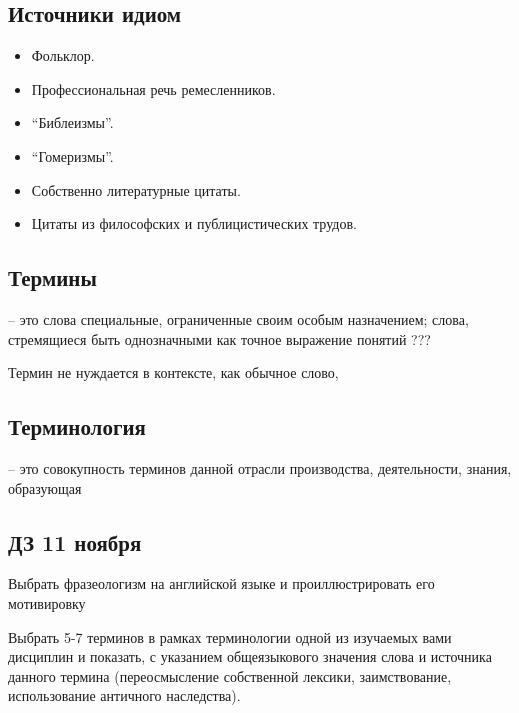 \documentclass{article}
\begin{document}
\subsection{Источники идиом}

\begin{itemize}
    \item Фольклор.
    \item Профессиональная речь ремесленников.
    \item ``Библеизмы''.
    \item ``Гомеризмы''.
    \item Собственно литературные цитаты.
    \item Цитаты из философских и публицистических трудов.
\end{itemize}

\subsection{Термины}

-- это слова специальные, ограниченные своим особым назначением;
слова, стремящиеся быть однозначными как точное выражение понятий ???

Термин не нуждается в контексте, как обычное слово,

\subsection{Терминология}

-- это совокупность терминов данной отрасли производства, деятельности, знания,
образующая

\subsection{ДЗ 11 ноября}

Выбрать фразеологизм на английской языке и проиллюстрировать его мотивировку

Выбрать 5-7 терминов в рамках терминологии одной из изучаемых вами дисциплин
и показать, с указанием общеязыкового значения слова и источника данного термина
(переосмысление собственной лексики, заимствование, использование античного наследства).
\end{document}

